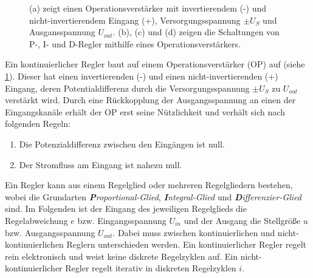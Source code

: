 \begin{figure}[h]
{{{	    	}
	}}
	\caption[Operationsverstärker, Regler]{(a) zeigt einen Operationsverstärker
	mit invertierendem (-) und nicht-invertierendem
	Eingang (+), Versorgungsspannung $\pm U_S$ und
	Ausgansspannung $U_{out}$. (b), (c) und (d) zeigen die Schaltungen von
	P-, I- und D-Regler mithilfe eines
	Operationsverstärkers.}\label{fig:operationsverstaerker}
\end{figure}
Ein kontinuierlicher Regler baut auf einem Operationsverstärker (OP) auf (siehe
\ref{fig:operationsverstaerker}). Dieser
hat einen invertierenden (-) und einen nicht-invertierenden (+) Eingang, deren Potentialdifferenz durch die
Versorgungsspannung $\pm U_S$ zu $U_{out}$ verstärkt wird. Durch eine
Rückkopplung der Ausgangsspannung an einen der Eingangskanäle erhält der OP erst
seine Nützlichkeit und verhält sich nach folgenden Regeln:
\begin{enumerate}
       \item Die Potenzialdifferenz zwischen den Eingängen ist null.
       \item Der Stromfluss am Eingang ist nahezu null.
\end{enumerate}
Ein Regler kann aus einem Regelglied oder mehreren Regelgliedern bestehen, wobei
die Grundarten \textit{\textbf{P}roportional-Glied}, \textit{\textbf{I}ntegral-Glied} und
\textit{\textbf{D}ifferenzier-Glied} sind. Im Folgenden ist der Eingang des
jeweiligen Regelglieds die Regelabweichung $e$ bzw. Eingangsspannung $U_{in}$
und der Ausgang die Stellgröße $u$ bzw. Ausgangsspannung $U_{out}$. Dabei muss
zwischen kontinuierlichen und nicht-kontinuierlichen Reglern unterschieden
werden. Ein kontinuierlicher Regler regelt rein elektronisch und weist keine
diskrete Regelzyklen auf. Ein nicht-kontinuierlicher Regler regelt iterativ in
diskreten Regelzyklen $i$.

